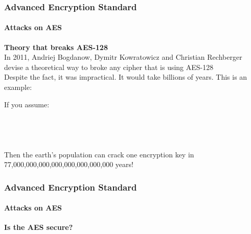 \begin{frame}
	\frametitle{Advanced Encryption Standard}
		\framesubtitle{Attacks on AES}
 		{\normalsize
		\textbf{Theory that breaks AES-128 }\\
		{In 2011, Andriej Bogdanow, Dymitr Kowratowicz and Christian Rechberger devise a theoretical way to broke any cipher that is using 		AES-128}\\
		{Despite the fact, it was impractical. It would take billions of years. This is an example:}\\
		}
		\begin{block}{}
		{\footnotesize
		{If you assume:}\\
		\hspace{0.5cm}{- Every person on the planet owns 10 computers.}\\
		\hspace{0.5cm}{- There are 7 billion people on the planet.}\\
		\hspace{0.5cm}{- Each of these computers can test 1 billion key combinations per second.}\\
    	\hspace{0.5cm}{- On average, you can crack the key after testing half of the possibilities.}\\
    	\vspace{0.2cm}
    	{Then the earth's population can crack one encryption key in 77,000,000,000,000,000,000,000,000 years!}\\
		}
		\end{block}
\end{frame}
	
\begin{frame}
\frametitle{Advanced Encryption Standard}
	\framesubtitle{Attacks on AES}
	\begin{center}
		\Huge \textbf{Is the AES secure?}
	\end{center}

\end{frame}

